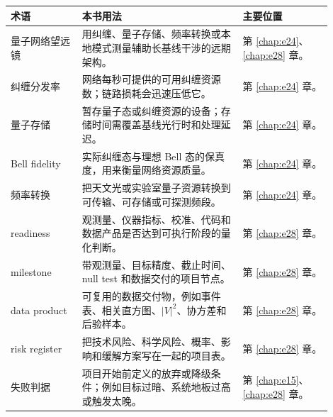 \begin{longtable}{p{0.20\linewidth}p{0.45\linewidth}p{0.25\linewidth}}
\toprule
术语 & 本书用法 & 主要位置 \\
\midrule
量子网络望远镜 & 用纠缠、量子存储、频率转换或本地模式测量辅助长基线干涉的远期架构。 & 第 \ref{chap:e24}、\ref{chap:e28} 章。 \\
纠缠分发率 & 网络每秒可提供的可用纠缠资源数；链路损耗会迅速压低它。 & 第 \ref{chap:e24} 章。 \\
量子存储 & 暂存量子态或纠缠资源的设备；存储时间需覆盖基线光行时和处理延迟。 & 第 \ref{chap:e24} 章。 \\
Bell fidelity & 实际纠缠态与理想 Bell 态的保真度，用来衡量网络资源质量。 & 第 \ref{chap:e24} 章。 \\
频率转换 & 把天文光或实验室量子资源转换到可传输、可存储或可探测频段。 & 第 \ref{chap:e24} 章。 \\
readiness & 观测量、仪器指标、校准、代码和数据产品是否达到可执行阶段的量化判断。 & 第 \ref{chap:e28} 章。 \\
milestone & 带观测量、目标精度、截止时间、null test 和数据交付的项目节点。 & 第 \ref{chap:e28} 章。 \\
data product & 可复用的数据交付物，例如事件表、相关直方图、\(|V|^2\)、协方差和后验样本。 & 第 \ref{chap:e28} 章。 \\
risk register & 把技术风险、科学风险、概率、影响和缓解方案写在一起的项目表。 & 第 \ref{chap:e28} 章。 \\
失败判据 & 项目开始前定义的放弃或降级条件；例如目标过暗、系统地板过高或触发太晚。 & 第 \ref{chap:e15}、\ref{chap:e28} 章。 \\
\bottomrule
\end{longtable}
